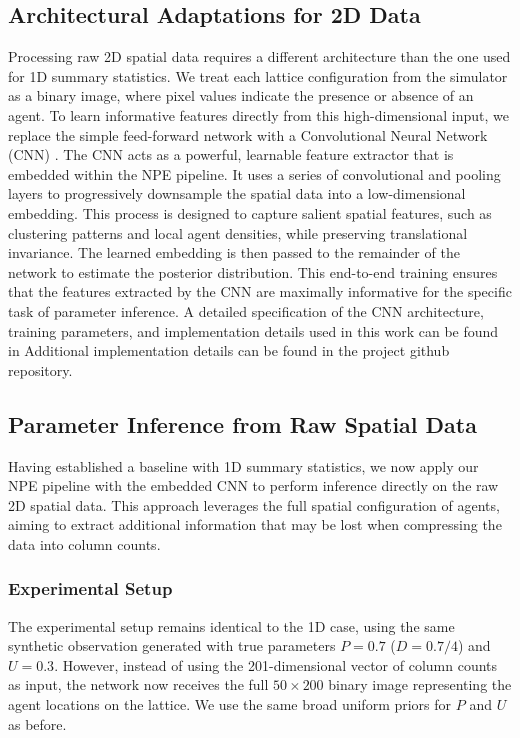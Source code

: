 \documentclass{article}
\begin{document}
\subsection{Architectural Adaptations for 2D Data}



Processing raw 2D spatial data requires a different architecture than the one used for 1D summary statistics. We treat each lattice configuration from the simulator as a binary image, where pixel values indicate the presence or absence of an agent. To learn informative features directly from this high-dimensional input, we replace the simple feed-forward network with a Convolutional Neural Network (CNN) \citep{lecun1998,krizhevsky2012,goodfellow2016}. The CNN acts as a powerful, learnable feature extractor that is embedded within the NPE pipeline. It uses a series of convolutional and pooling layers to progressively downsample the spatial data into a low-dimensional embedding. This process is designed to capture salient spatial features, such as clustering patterns and local agent densities, while preserving translational invariance. The learned embedding is then passed to the remainder of the network to estimate the posterior distribution. This end-to-end training ensures that the features extracted by the CNN are maximally informative for the specific task of parameter inference. A detailed specification of the CNN architecture, training parameters, and implementation details used in this work can be found in Additional implementation details can be found in the project github repository.





\subsection{Parameter Inference from Raw Spatial Data}

Having established a baseline with 1D summary statistics, we now apply our NPE pipeline with the embedded CNN to perform inference directly on the raw 2D spatial data. This approach leverages the full spatial configuration of agents, aiming to extract additional information that may be lost when compressing the data into column counts.

\subsubsection{Experimental Setup}
The experimental setup remains identical to the 1D case, using the same synthetic observation generated with true parameters $P = 0.7$ ($D=0.7/4$) and $U = 0.3$. However, instead of using the 201-dimensional vector of column counts as input, the network now receives the full $50 \times 200$ binary image representing the agent locations on the lattice. We use the same broad uniform priors for $P$ and $U$ as before. 
\end{document}
